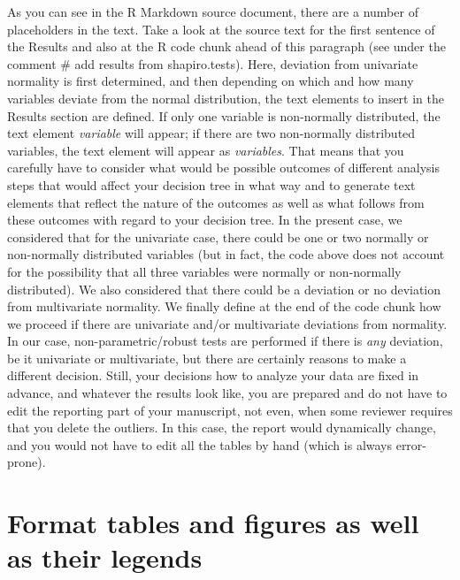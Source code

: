 \documentclass[
]{article}
\begin{document}
As you can see in the R Markdown source document, there are a number of
placeholders in the text. Take a look at the source text for the first
sentence of the Results and also at the R code chunk ahead of this
paragraph (see under the comment \# add results from shapiro.tests).
Here, deviation from univariate normality is first determined, and then
depending on which and how many variables deviate from the normal
distribution, the text elements to insert in the Results section are
defined. If only one variable is non-normally distributed, the text
element \emph{variable} will appear; if there are two non-normally
distributed variables, the text element will appear as \emph{variables}.
That means that you carefully have to consider what would be possible
outcomes of different analysis steps that would affect your decision
tree in what way and to generate text elements that reflect the nature
of the outcomes as well as what follows from these outcomes with regard
to your decision tree. In the present case, we considered that for the
univariate case, there could be one or two normally or non-normally
distributed variables (but in fact, the code above does not account for
the possibility that all three variables were normally or non-normally
distributed). We also considered that there could be a deviation or no
deviation from multivariate normality. We finally define at the end of
the code chunk how we proceed if there are univariate and/or
multivariate deviations from normality. In our case,
non-parametric/robust tests are performed if there is \emph{any}
deviation, be it univariate or multivariate, but there are certainly
reasons to make a different decision. Still, your decisions how to
analyze your data are fixed in advance, and whatever the results look
like, you are prepared and do not have to edit the reporting part of
your manuscript, not even, when some reviewer requires that you delete
the outliers. In this case, the report would dynamically change, and you
would not have to edit all the tables by hand (which is always
error-prone).

\hypertarget{format-tables-and-figures-as-well-as-their-legends}{%
\section{Format tables and figures as well as their
legends}\label{format-tables-and-figures-as-well-as-their-legends}}
\end{document}
